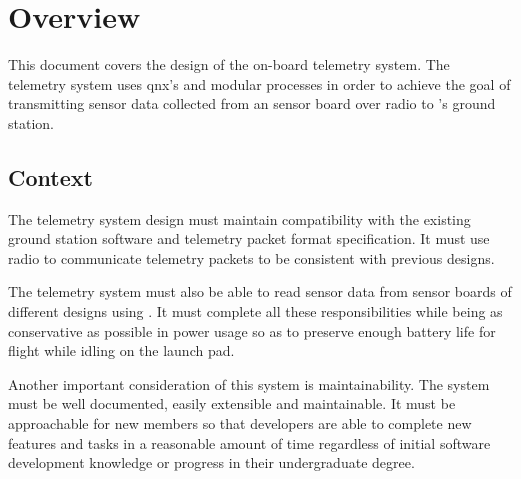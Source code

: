 \section{Overview}

This document covers the design of the  on-board telemetry system. The telemetry system uses
\gls{qnx}'s  and modular processes in order to achieve the goal of transmitting sensor data collected
from an  sensor board over  radio to 's 
ground station.

\subsection{Context}

The  telemetry system design must maintain compatibility with the existing ground station
software and telemetry packet format specification. It must use  radio to communicate telemetry
packets to be consistent with previous designs.

The telemetry system must also be able to read sensor data from  sensor boards of different designs
using . It must complete all these responsibilities while being as conservative as possible in power
usage so as to preserve enough battery life for flight while idling on the launch pad.

Another important consideration of this system is maintainability. The system must be well documented, easily
extensible and maintainable. It must be approachable for new  members so that developers are
able to complete new features and tasks in a reasonable amount of time regardless of initial software development
knowledge or progress in their undergraduate degree.
